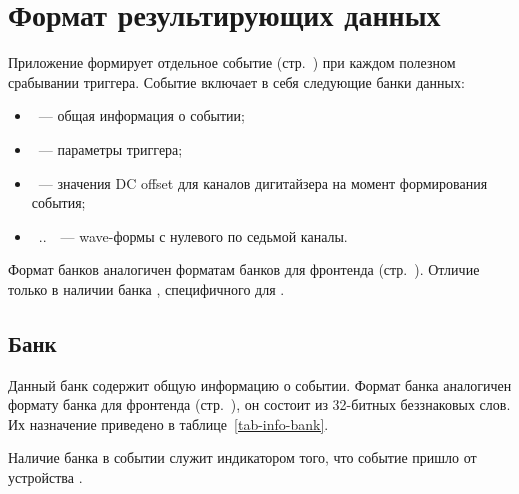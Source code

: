 \section{Формат результирующих данных}

Приложение \FE{} формирует отдельное событие (стр.~\pageref{sec-midas-event}) при каждом полезном срабывании триггера. Событие включает в себя следующие банки данных:

\begin{itemize}

\item {}~--- общая информация о событии;
\item {}~--- параметры триггера;
\item {}~--- значения DC offset для каналов дигитайзера на момент формирования события;
\item {}~..~~--- wave-формы с нулевого по седьмой каналы.

\end{itemize}

Формат банков аналогичен форматам банков для фронтенда  (стр.~\pageref{sec_v1720_event}). Отличие только в наличии банка , специфичного для \DEVICE{}.

\subsection{Банк }
\label{sec_v1724_bank_info}

Данный банк содержит общую информацию о событии. Формат банка аналогичен формату банка  для фронтенда  (стр.~\pageref{sec_bank_info}), он состоит из 32-битных беззнаковых слов. Их назначение приведено в таблице~\ref{tab-info-bank}.

Наличие банка  в событии служит индикатором того, что событие пришло от устройства \DEVICE{}.
